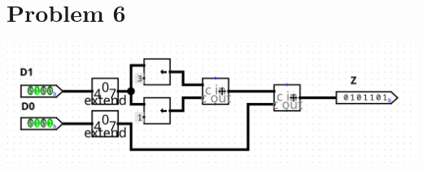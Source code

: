 \documentclass[12pt]{article}
\begin{document}
\section*{Problem 6}
\begin{center}
   \includegraphics[scale=0.25]{Problem6.png}
\end{center}
\end{document}
